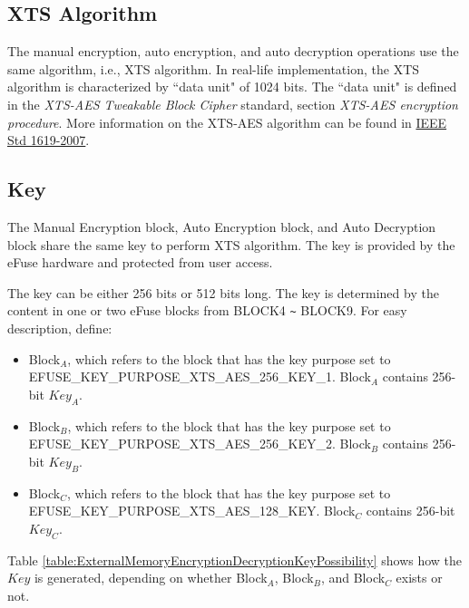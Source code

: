 \documentclass[main\_\_EN.tex]{subfiles}
\begin{document}
\subsection{XTS Algorithm} \label{XTS algorithm standard}
The manual encryption, auto encryption, and auto decryption operations use the same algorithm, i.e., XTS algorithm. In real-life implementation, the XTS algorithm is characterized by ``data unit" of 1024 bits. The ``data unit" is defined in the
\textit{XTS-AES Tweakable Block Cipher} standard, section \textit{XTS-AES encryption procedure}. More information on the XTS-AES algorithm can be found in \href{https://ieeexplore.ieee.org/document/4493450}{IEEE Std 1619-2007}.

\subsection{Key} \label{XTS Key}

The Manual Encryption block, Auto Encryption block, and Auto Decryption block share the same key to perform XTS algorithm. The key is provided by the eFuse hardware and protected from user access.

The key can be either 256 bits or 512 bits long. The key is determined by the content in one or two eFuse blocks from BLOCK4 \verb+~+ BLOCK9. For easy description, define:
\begin{itemize}
    \item Block$_A$, which refers to the block that has the key purpose set to EFUSE\_KEY\_PURPOSE\_XTS\_AES\_256\_KEY\_1. Block$_A$ contains 256-bit \begin{math}Key_{A}\end{math}.

    \item Block$_B$, which refers to the block that has the key purpose set to EFUSE\_KEY\_PURPOSE\_XTS\_AES\_256\_KEY\_2. Block$_B$ contains 256-bit \begin{math}Key_{B}\end{math}.

    \item Block$_C$, which refers to the block that has the key purpose set to EFUSE\_KEY\_PURPOSE\_XTS\_AES\_128\_KEY. Block$_C$ contains 256-bit \begin{math}Key_{C}\end{math}.
\end{itemize}

Table \ref{table:ExternalMemoryEncryptionDecryptionKeyPossibility} shows how the \begin{math}Key\end{math} is generated, depending on whether Block$_A$, Block$_B$, and Block$_C$ exists or not.
\end{document}
